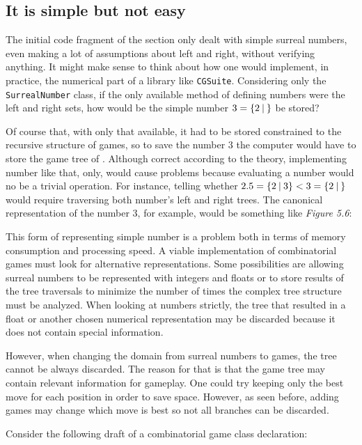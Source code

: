 \subsection*{It is simple but not easy}

The initial code fragment of the section only dealt with simple surreal numbers, even making a lot of assumptions about left and right, without verifying anything. It might make sense to think about how one would implement, in practice, the numerical part of a library like \texttt{CGSuite}. Considering only the \texttt{SurrealNumber} class, if the only available method of defining numbers were the left and right sets, how would be the simple number $3 = \mbox{$\{2\:|\:\}$}$ be stored?

Of course that, with only that available, it had to be stored constrained to the recursive structure of games, so to save the number $3$ the computer would have to store the game tree of \gam{\gam{\gam{\gam{}{}}{}}{}}{}. Although correct according to the theory, implementing number like that, only, would cause problems because evaluating a number would no be a trivial operation. For instance, telling whether $2.5 = \mbox{$\{2\:|\:3\}$} < 3 = \mbox{$\{2\:|\:\}$}$ would require traversing both number's left and right trees. The canonical representation of the number 3, for example, would be something like \textit{Figure 5.6}:



This form of representing simple number is a problem both in terms of memory consumption and processing speed. A viable implementation of combinatorial games must look for alternative representations. Some possibilities are allowing surreal numbers to be represented with integers and floats or to store results of the tree traversals to minimize the number of times the complex tree structure must be analyzed. When looking at numbers strictly, the tree that resulted in a float or another chosen numerical representation may be discarded because it does not contain special information.

However, when changing the domain from surreal numbers to games, the tree cannot be always discarded. The reason for that is that the game tree may contain relevant information for gameplay. One could try keeping only the best move for each position in order to save space. However, as seen before, adding games may change which move is best so not all branches can be discarded.

Consider the following draft of a combinatorial game class declaration:

